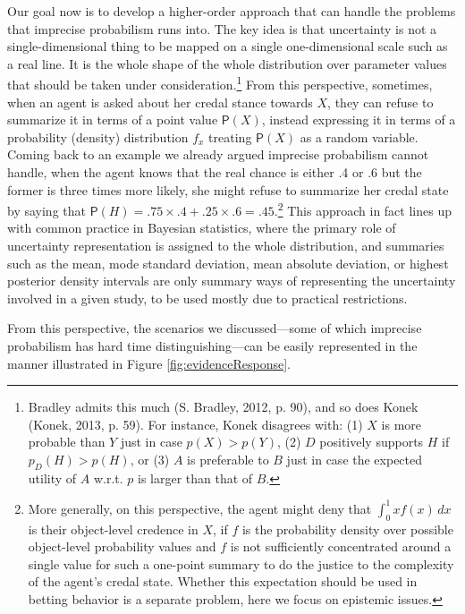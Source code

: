 \documentclass[
  10pt,
  dvipsnames,enabledeprecatedfontcommands]{scrartcl}
\begin{document}
Our goal now is to develop a higher-order approach that can handle the
problems that imprecise probabilism runs into. The key idea is that
uncertainty is not a single-dimensional thing to be mapped on a single
one-dimensional scale such as a real line. It is the whole shape of the
whole distribution over parameter values that should be taken under
consideration.\footnote{Bradley admits this much (S. Bradley, 2012, p.
  90), and so does Konek (Konek, 2013, p. 59). For instance, Konek
  disagrees with: (1) \(X\) is more probable than \(Y\) just in case
  \(p(X)>p(Y)\), (2) \(D\) positively supports \(H\) if
  \(p_D(H)> p(H)\), or (3) \(A\) is preferable to \(B\) just in case the
  expected utility of \(A\) w.r.t. \(p\) is larger than that of \(B\).}
From this perspective, sometimes, when an agent is asked about her
credal stance towards \(X\), they can refuse to summarize it in terms of
a point value \(\mathsf{P}(X)\), instead expressing it in terms of a
probability (density) distribution \(f_x\) treating \(\mathsf{P}(X)\) as
a random variable. Coming back to an example we already argued imprecise
probabilism cannot handle, when the agent knows that the real chance is
either .4 or .6 but the former is three times more likely, she might
refuse to summarize her credal state by saying that
\(\mathsf{P}(H) = .75 \times .4 + .25 \times .6 = .45\).\footnote{More
  generally, on this perspective, the agent might deny that
  \(\int_{0}^{1} x f(x) \, dx\) is their object-level credence in \(X\),
  if \(f\) is the probability density over possible object-level
  probability values and \(f\) is not sufficiently concentrated around a
  single value for such a one-point summary to do the justice to the
  complexity of the agent's credal state. Whether this expectation
  should be used in betting behavior is a separate problem, here we
  focus on epistemic issues.} This approach in fact lines up with common
practice in Bayesian statistics, where the primary role of uncertainty
representation is assigned to the whole distribution, and summaries such
as the mean, mode standard deviation, mean absolute deviation, or
highest posterior density intervals are only summary ways of
representing the uncertainty involved in a given study, to be used
mostly due to practical restrictions.

From this perspective, the scenarios we discussed---some of which
imprecise probabilism has hard time distinguishing---can be easily
represented in the manner illustrated in Figure
\ref{fig:evidenceResponse}.
\end{document}
